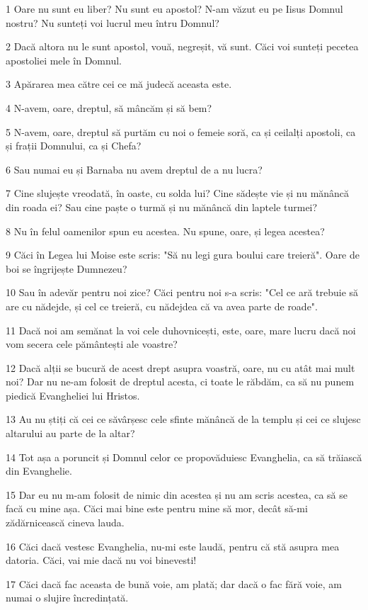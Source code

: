 \par 1 Oare nu sunt eu liber? Nu sunt eu apostol? N-am văzut eu pe Iisus Domnul nostru? Nu sunteți voi lucrul meu întru Domnul?
\par 2 Dacă altora nu le sunt apostol, vouă, negreșit, vă sunt. Căci voi sunteți pecetea apostoliei mele în Domnul.
\par 3 Apărarea mea către cei ce mă judecă aceasta este.
\par 4 N-avem, oare, dreptul, să mâncăm și să bem?
\par 5 N-avem, oare, dreptul să purtăm cu noi o femeie soră, ca și ceilalți apostoli, ca și frații Domnului, ca și Chefa?
\par 6 Sau numai eu și Barnaba nu avem dreptul de a nu lucra?
\par 7 Cine slujește vreodată, în oaste, cu solda lui? Cine sădește vie și nu mănâncă din roada ei? Sau cine paște o turmă și nu mănâncă din laptele turmei?
\par 8 Nu în felul oamenilor spun eu acestea. Nu spune, oare, și legea acestea?
\par 9 Căci în Legea lui Moise este scris: "Să nu legi gura boului care treieră". Oare de boi se îngrijește Dumnezeu?
\par 10 Sau în adevăr pentru noi zice? Căci pentru noi s-a scris: "Cel ce ară trebuie să are cu nădejde, și cel ce treieră, cu nădejdea că va avea parte de roade".
\par 11 Dacă noi am semănat la voi cele duhovnicești, este, oare, mare lucru dacă noi vom secera cele pământești ale voastre?
\par 12 Dacă alții se bucură de acest drept asupra voastră, oare, nu cu atât mai mult noi? Dar nu ne-am folosit de dreptul acesta, ci toate le răbdăm, ca să nu punem piedică Evangheliei lui Hristos.
\par 13 Au nu știți că cei ce săvârșesc cele sfinte mănâncă de la templu și cei ce slujesc altarului au parte de la altar?
\par 14 Tot așa a poruncit și Domnul celor ce propovăduiesc Evanghelia, ca să trăiască din Evanghelie.
\par 15 Dar eu nu m-am folosit de nimic din acestea și nu am scris acestea, ca să se facă cu mine așa. Căci mai bine este pentru mine să mor, decât să-mi zădărnicească cineva lauda.
\par 16 Căci dacă vestesc Evanghelia, nu-mi este laudă, pentru că stă asupra mea datoria. Căci, vai mie dacă nu voi binevesti!
\par 17 Căci dacă fac aceasta de bună voie, am plată; dar dacă o fac fără voie, am numai o slujire încredințată.
